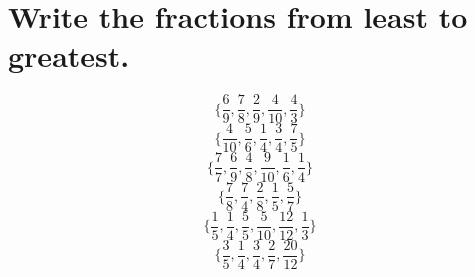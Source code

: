 \documentclass[12pt, fleqn, leqno]{article}
\begin{document}
\section*{Write the fractions from least to greatest.}
\thispagestyle{plain}
        \begin{equation}\{\frac{6}{9}, \frac{7}{8}, \frac{2}{9}, \frac{4}{10}, \frac{4}{3}\}\end{equation}
        \vspace{4cm}
        \begin{equation}\{\frac{4}{10}, \frac{5}{6}, \frac{1}{4}, \frac{3}{4}, \frac{7}{5}\}\end{equation}
        \vspace{4cm}
        \begin{equation}\{\frac{7}{7}, \frac{6}{9}, \frac{4}{8}, \frac{9}{10}, \frac{1}{6}, \frac{1}{4}\}\end{equation}
        \vspace{4cm}
        \begin{equation}\{\frac{7}{8}, \frac{7}{4}, \frac{2}{8}, \frac{1}{5}, \frac{5}{7}\}\end{equation}
        \vspace{4cm}
        \begin{equation}\{\frac{1}{5}, \frac{1}{4}, \frac{5}{5}, \frac{5}{10}, \frac{12}{12}, \frac{1}{3}\}\end{equation}
        \vspace{4cm}
        \begin{equation}\{\frac{3}{5}, \frac{1}{4}, \frac{3}{4}, \frac{2}{7}, \frac{20}{12}\}\end{equation}
        \vspace{4cm}
\newpage

    
\end{document}
